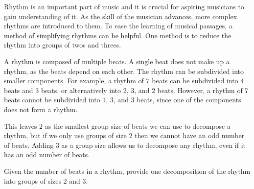 

Rhythm is an important part of music and it is crucial for aspiring musicians to gain understanding of it.
As the skill of the musician advances, more complex rhythms are introduced to them.
To ease the learning of musical passages, a method of simplifying rhythms can be helpful.
One method is to reduce the rhythm into groups of twos and threes.

A rhythm is composed of multiple beats.
A single beat does not make up a rhythm, as the beats depend on each other.
The rhythm can be subdivided into smaller components.
For example, a rhythm of $7$ beats can be subdivided into $4$ beats and $3$ beats, or alternatively into $2$, $3$, and $2$ beats.
However, a rhythm of $7$ beats cannot be subdivided into $1$, $3$, and  $3$ beats, since one of the components does not form a rhythm.

This leaves $2$ as the smallest group size of beats we can use to decompose a rhythm, but if we only use groups of size $2$ then we cannot have an odd number of beats.
Adding $3$ as a group size allows us to decompose any rhythm, even if it has an odd number of beats.

Given the number of beats in a rhythm, provide one decomposition of the rhythm into groups of sizes $2$ and $3$.

